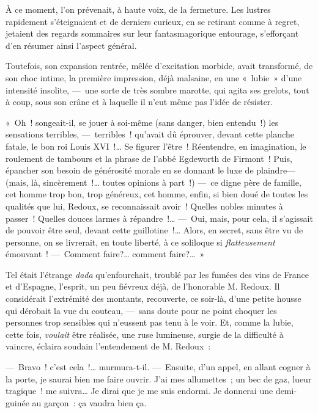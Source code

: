 \documentclass[french,twoside]{book} %
\begin{document}
À ce moment, l’on prévenait, à haute voix, de la fermeture. Les lustres rapidement s’éteignaient et de derniers curieux, en se retirant comme à regret, jetaient des regards sommaires sur leur fantasmagorique entourage, s’efforçant d’en résumer ainsi l’aspect général.\par
Toutefois, son expansion rentrée, mêlée d’excitation morbide, avait transformé, de son choc intime, la première impression, déjà malsaine, en une « lubie » d’une intensité insolite, — une sorte de très sombre marotte, qui agita ses grelots, tout à coup, sous son crâne et à laquelle il n’eut même pas l’idée de résister.\par
« Oh ! songeait-il, se jouer à soi-même (sans danger, bien entendu !) les sensations terribles, — terribles ! qu’avait dû éprouver, devant cette planche fatale, le bon roi Louis XVI !… Se figurer l’être ! Réentendre, en imagination, le roulement de tambours et la phrase de l’abbé Egdeworth de Firmont ! Puis, épancher son besoin   de générosité morale en se donnant le luxe de plaindre—(mais, là, sincèrement !… toutes opinions à part !) — ce digne père de famille, cet homme trop bon, trop généreux, cet homme, enfin, si bien doué de toutes les qualités que lui, Redoux, se reconnaissait avoir ! Quelles nobles minutes à passer ! Quelles douces larmes à répandre !… — Oui, mais, pour cela, il s’agissait de pouvoir être seul, devant cette guillotine !… Alors, en secret, sans être vu de personne, on se livrerait, en toute liberté, à ce soliloque si \emph{flatteusement} émouvant ! — Comment faire?… comment faire?… »\par
Tel était l’étrange \emph{dada} qu’enfourchait, troublé par les fumées des vins de France et d’Espagne, l’esprit, un peu fiévreux déjà, de l’honorable M. Redoux. Il considérait l’extrémité des montants, recouverte, ce soir-là, d’une petite housse qui dérobait la vue du couteau, — sans doute pour ne point choquer les personnes trop sensibles qui n’eussent pas tenu à le voir. Et, comme la lubie, cette fois, \emph{voulait} être réalisée, une ruse lumineuse, surgie de la   difficulté à vaincre, éclaira soudain l’entendement de M. Redoux :\par
— Bravo ! c’est cela !… murmura-t-il. — Ensuite, d’un appel, en allant cogner à la porte, je saurai bien me faire ouvrir. J’ai mes allumettes ; un bec de gaz, lueur tragique ! me suivra… Je dirai que je me suis endormi. Je donnerai une demi-guinée au garçon : ça vaudra bien ça.\par
\end{document}
